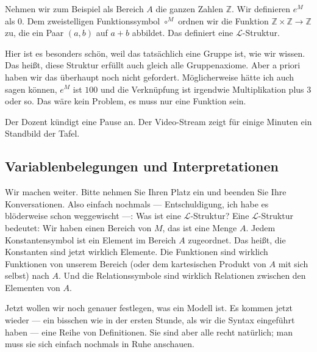 \begin{spoken-clean}[00:43:20 - 00:45:10]
Nehmen wir zum Beispiel als Bereich $A$ die ganzen Zahlen $\mathbb{Z}$. Wir definieren $e^M$ als $0$. Dem zweistelligen Funktionssymbol $\circ^M$ ordnen wir die Funktion $\mathbb{Z} \times \mathbb{Z} \to \mathbb{Z}$ zu, die ein Paar $(a, b)$ auf $a + b$ abbildet. Das definiert eine $\mathcal{L}$-Struktur.

Hier ist es besonders schön, weil das tatsächlich eine Gruppe ist, wie wir wissen. Das heißt, diese Struktur erfüllt auch gleich alle Gruppenaxiome. Aber a priori haben wir das überhaupt noch nicht gefordert. Möglicherweise hätte ich auch sagen können, $e^M$ ist $100$ und die Verknüpfung ist irgendwie Multiplikation plus $3$ oder so. Das wäre kein Problem, es muss nur eine Funktion sein.
\end{spoken-clean}

\begin{lecture-break}[Pause]
Der Dozent kündigt eine Pause an. Der Video-Stream zeigt für einige Minuten ein Standbild der Tafel.
\end{lecture-break}

\subsection{Variablenbelegungen und Interpretationen}

\begin{spoken-clean}[00:48:00 - 00:50:35]
Wir machen weiter. Bitte nehmen Sie Ihren Platz ein und beenden Sie Ihre Konversationen. Also einfach nochmals --- Entschuldigung, ich habe es blöderweise schon weggewischt ---: Was ist eine $\mathcal{L}$-Struktur? Eine $\mathcal{L}$-Struktur bedeutet: Wir haben einen Bereich von $M$, das ist eine Menge $A$. Jedem Konstantensymbol ist ein Element im Bereich $A$ zugeordnet. Das heißt, die Konstanten sind jetzt wirklich Elemente. Die Funktionen sind wirklich Funktionen von unserem Bereich (oder dem kartesischen Produkt von $A$ mit sich selbst) nach $A$. Und die Relationssymbole sind wirklich Relationen zwischen den Elementen von $A$.

Jetzt wollen wir noch genauer festlegen, was ein Modell ist. Es kommen jetzt wieder --- ein bisschen wie in der ersten Stunde, als wir die Syntax eingeführt haben --- eine Reihe von Definitionen. Sie sind aber alle recht natürlich; man muss sie sich einfach nochmals in Ruhe anschauen.
\end{spoken-clean}


